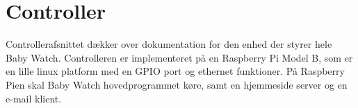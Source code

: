 \chapter{Controller}

Controllerafsnittet dækker over dokumentation for den enhed der styrer hele Baby Watch. Controlleren er implementeret på en Raspberry Pi Model B, som er en lille linux platform med en GPIO port og ethernet funktioner. På Raspberry Pien skal Baby Watch hovedprogrammet køre, samt en hjemmeside server og en e-mail klient.





